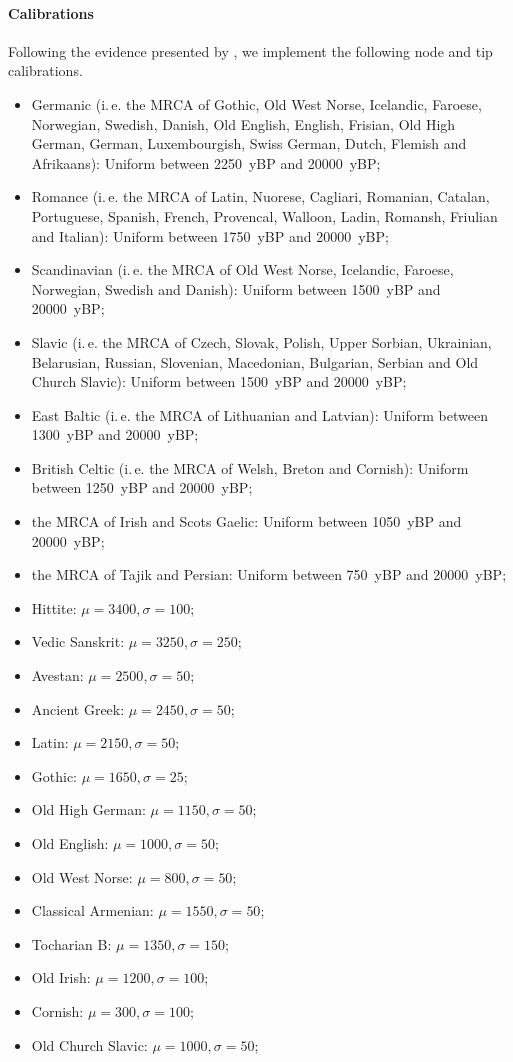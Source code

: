 \documentclass[a4paper,12pt]{scrartcl}
\begin{document}
\paragraph{Calibrations}
Following the evidence presented by \textcite[Tables 7 and 12]{chang2015ancestryconstrained}, we implement the following node and tip calibrations.
\begin{itemize}
\item Germanic (i.\,e. the MRCA of Gothic, Old West Norse, Icelandic, Faroese, Norwegian, Swedish, Danish, Old English, English, Frisian, Old High German, German, Luxembourgish, Swiss German, Dutch, Flemish and Afrikaans): Uniform between 2250~yBP and 20000~yBP;
\item Romance (i.\,e. the MRCA of Latin, Nuorese, Cagliari, Romanian, Catalan, Portuguese, Spanish, French, Provencal, Walloon, Ladin, Romansh, Friulian and Italian): Uniform between 1750~yBP and 20000~yBP;
\item Scandinavian (i.\,e. the MRCA of Old West Norse, Icelandic, Faroese, Norwegian, Swedish and Danish): Uniform between 1500~yBP and 20000~yBP;
\item Slavic (i.\,e. the MRCA of Czech, Slovak, Polish, Upper Sorbian, Ukrainian, Belarusian, Russian, Slovenian, Macedonian, Bulgarian, Serbian and Old Church Slavic): Uniform between 1500~yBP and 20000~yBP;
\item East Baltic (i.\,e. the MRCA of Lithuanian and Latvian): Uniform between 1300~yBP and 20000~yBP;
\item British Celtic (i.\,e. the MRCA of Welsh, Breton and Cornish): Uniform between 1250~yBP and 20000~yBP;
\item the MRCA of Irish and Scots Gaelic: Uniform between 1050~yBP and 20000~yBP;
\item the MRCA of Tajik and Persian: Uniform between 750~yBP and 20000~yBP;

        \item Hittite: $\mu=3400, \sigma=100$;
        \item Vedic Sanskrit: $\mu=3250, \sigma=250$;
        \item Avestan: $\mu=2500, \sigma=50$;
        \item Ancient Greek: $\mu=2450, \sigma=50$;
        \item Latin: $\mu=2150, \sigma=50$;
        \item Gothic: $\mu=1650, \sigma=25$;
        \item Old High German: $\mu=1150, \sigma=50$;
        \item Old English: $\mu=1000, \sigma=50$;
        \item Old West Norse: $\mu=800, \sigma=50$;
        \item Classical Armenian: $\mu=1550, \sigma=50$;
        \item Tocharian B: $\mu=1350, \sigma=150$;
        \item Old Irish: $\mu=1200, \sigma=100$;
        \item Cornish: $\mu=300, \sigma=100$;
        \item Old Church Slavic: $\mu=1000, \sigma=50$;
\end{itemize}
\end{document}
